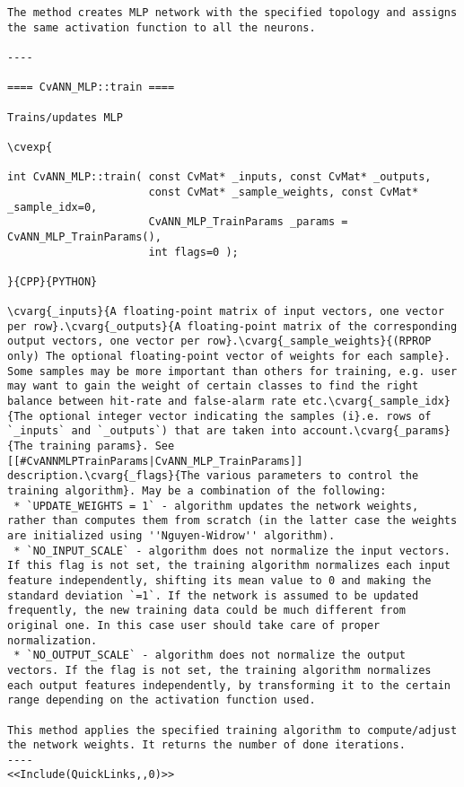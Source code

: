 \begin{verbatim}
The method creates MLP network with the specified topology and assigns the same activation function to all the neurons.

----

==== CvANN_MLP::train ====

Trains/updates MLP

\cvexp{

int CvANN_MLP::train( const CvMat* _inputs, const CvMat* _outputs,
                      const CvMat* _sample_weights, const CvMat* _sample_idx=0,
                      CvANN_MLP_TrainParams _params = CvANN_MLP_TrainParams(),
                      int flags=0 );

}{CPP}{PYTHON}

\cvarg{_inputs}{A floating-point matrix of input vectors, one vector per row}.\cvarg{_outputs}{A floating-point matrix of the corresponding output vectors, one vector per row}.\cvarg{_sample_weights}{(RPROP only) The optional floating-point vector of weights for each sample}. Some samples may be more important than others for training, e.g. user may want to gain the weight of certain classes to find the right balance between hit-rate and false-alarm rate etc.\cvarg{_sample_idx}{The optional integer vector indicating the samples (i}.e. rows of `_inputs` and `_outputs`) that are taken into account.\cvarg{_params}{The training params}. See [[#CvANNMLPTrainParams|CvANN_MLP_TrainParams]] description.\cvarg{_flags}{The various parameters to control the training algorithm}. May be a combination of the following:
 * `UPDATE_WEIGHTS = 1` - algorithm updates the network weights, rather than computes them from scratch (in the latter case the weights are initialized using ''Nguyen-Widrow'' algorithm).
 * `NO_INPUT_SCALE` - algorithm does not normalize the input vectors. If this flag is not set, the training algorithm normalizes each input feature independently, shifting its mean value to 0 and making the standard deviation `=1`. If the network is assumed to be updated frequently, the new training data could be much different from original one. In this case user should take care of proper normalization.
 * `NO_OUTPUT_SCALE` - algorithm does not normalize the output vectors. If the flag is not set, the training algorithm normalizes each output features independently, by transforming it to the certain range depending on the activation function used.

This method applies the specified training algorithm to compute/adjust the network weights. It returns the number of done iterations.
----
<<Include(QuickLinks,,0)>>
\end{verbatim}
